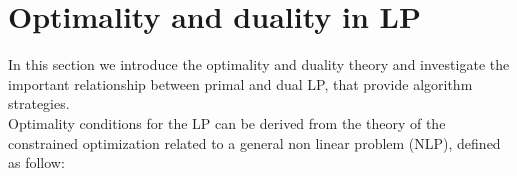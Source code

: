 \documentclass[a4paper,10 pt,titlepage,twoside]{book}
\theoremstyle{plain}
\theoremstyle{definition}
\newtheorem{ex}[thm]{Example}
\theoremstyle{remark}
\begin{document}

\section{Optimality and duality in LP}
In this section we introduce the optimality and duality theory and investigate the important relationship between primal and dual LP, that provide algorithm strategies.\\ 
Optimality conditions for the LP can be derived from the theory of the constrained optimization related to a general non linear problem (NLP), defined as follow:
\end{document}
